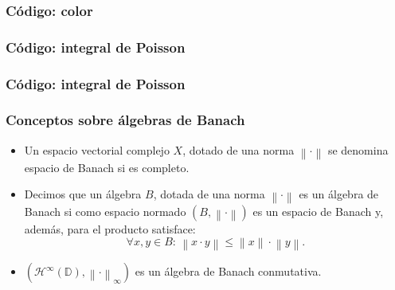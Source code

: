 \documentclass[spanish, a4paper, 12pt, final, slideColor, nototal, colorBG, pdf, noaccumulate, darkblue]{beamer}
\providecommand{\norm}[1]{\left\lVert#1\right\rVert}
\providecommand{\norminf}[1]{\norm{#1}_{\infty}}
\providecommand{\bholomorphic}[1]{\mathcal{H}^{\infty}(#1)}
\newcommand{\disk}{\mathbb{D}}
\begin{document}
\begin{frame}
    \frametitle{Código: color}
    
\end{frame}

\begin{frame}
    \frametitle{Código: integral de Poisson}
    
\end{frame}

\begin{frame}
    \frametitle{Código: integral de Poisson}
    
\end{frame}


\begin{frame}
    \frametitle{Conceptos sobre álgebras de Banach}
    \begin{itemize}
        \item Un espacio vectorial complejo $X$, dotado de una norma $\norm{\cdot}$ se denomina espacio de Banach si es completo.

        \item Decimos que un álgebra $B$, dotada de una norma $\norm{\cdot}$ es un álgebra de Banach si como espacio normado $(B, \norm{\cdot})$ es un espacio de Banach y, además, para el producto satisface:
            \begin{equation*}
                \forall x, y \in B: \, \norm{x \cdot y} \leq \norm{x} \cdot \norm{y}.
            \end{equation*}

        \item $(\bholomorphic{\disk}, \norminf{\cdot})$ es un álgebra de Banach conmutativa.
    \end{itemize}
\end{frame}

\end{document}
